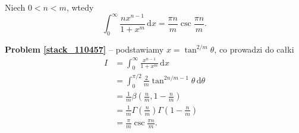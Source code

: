 %

\begin{problem_with_solution}[pytanie 110457]
    \label{stack_110457}%
    Niech $0 < n < m$, wtedy
    \begin{equation}
        \int_0^\infty \frac{n x^{n-1}}{1 + x^m} \,\mathrm{d} x = \frac {\pi n} m \operatorname{csc} \frac {\pi n}{m}.
    \end{equation}
\end{problem_with_solution}

\textbf{Problem \ref{stack_110457}} -- podstawiamy $x = \tan^{2/m} \theta$, co prowadzi do całki
\begin{align}
    I & = \int_0^\infty \frac{x^{n-1}}{1 + x^m} \,\mathrm{d} x \\
      & = \int_0^{\pi/2} \frac 2 m \tan^{2n/m - 1} \theta \,\mathrm{d}\theta \\
      & = \frac 1 m \beta\left( \frac nm, 1 - \frac nm \right) \\
      & = \frac 1 m \Gamma \left(\frac nm\right) \Gamma \left(1 - \frac nm\right) \\
      & = \frac \pi m \operatorname{csc} \frac {\pi n}{m}.
\end{align}

%
